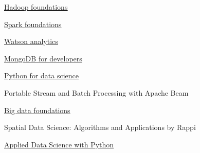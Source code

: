 %
%
%


\begin{coursework}


        {\href{https://www.youracclaim.com/badges/e93bb55f-3c60-4bfc-9817-347ad2a8bd2a/public_url}
        {\underline{Hadoop foundations}}}

        {\href{https://www.youracclaim.com/badges/c565d034-56d2-467c-b238-34de90b44222/public_url}
        {\underline{Spark foundations}}}

        {\href{https://www.youracclaim.com/badges/89aa54fb-143a-4053-9a97-a7b1461e1f60/public_url}
        {\underline{Watson analytics}}}

        {\href{https://university.mongodb.com/course_completion/30f19185172f43e58ae4a0cd9ce13ff0}
        {\underline{MongoDB for developers}}}


        {\href{https://courses.edx.org/certificates/0626a02340944e6b9b1854be5e171da0}
        {\underline{Python for data science}}}

        {Portable Stream and Batch Processing with Apache Beam}


        {\href{https://www.youracclaim.com/badges/3245c262-8039-4498-a57a-ddeb5762be21/public_url}
        {\underline{Big data foundations}}}

    
        {Spatial Data Science: Algorithms and Applications by Rappi}
    
        {\href{https://www.youracclaim.com/badges/6f524dff-5ffb-42bd-8e32-f4f3ea50e26c/public_url}
        {\underline{Applied Data Science with Python}}}

\end{coursework}